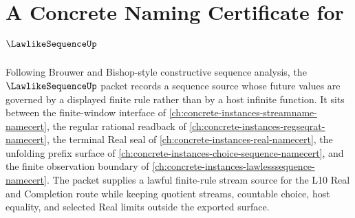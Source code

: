 \chapter{A Concrete Naming Certificate for $\LawlikeSequenceUp$}
\label{ch:concrete-instances-lawlike-sequence-namecert}

Following Brouwer and Bishop-style constructive sequence analysis, the $\LawlikeSequenceUp$ packet records a sequence source whose future values are governed by a displayed finite rule rather than by a host infinite function. It sits between the finite-window interface of \autoref{ch:concrete-instances-streamname-namecert}, the regular rational readback of \autoref{ch:concrete-instances-regseqrat-namecert}, the terminal Real seal of \autoref{ch:concrete-instances-real-namecert}, the unfolding prefix surface of \autoref{ch:concrete-instances-choice-sequence-namecert}, and the finite observation boundary of \autoref{ch:concrete-instances-lawlesssequence-namecert}. The packet supplies a lawful finite-rule stream source for the L10 Real and Completion route while keeping quotient streams, countable choice, host equality, and selected Real limits outside the exported surface.

